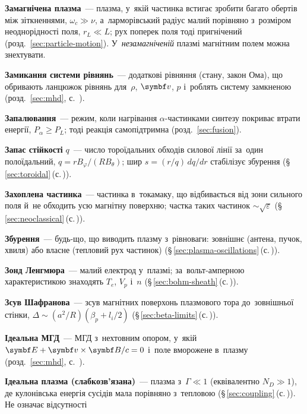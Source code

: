	\item \textbf{Замагнічена плазма}~--- плазма, у~якій частинка встигає зробити багато обертів між
	  зіткненнями, $\omega_c\gg\nu$, а~ларморівський радіус малий порівняно з~розміром неоднорідності поля,
	  $r_L\ll L$; рух поперек поля тоді пригнічений (розд.~\ref{sec:particle-motion}). У~\emph{незамагніченій}
	  плазмі магнітним полем можна знехтувати.
	\item \textbf{Замикання системи рівнянь}~--- додаткові рівняння (стану, закон Ома), що обривають ланцюжок рівнянь для~$\rho$, $\vect v$, $p$ і~роблять систему замкненою (розд.~\ref{sec:mhd}, с.~\pageref{sec:mhd}).
	\item \textbf{Запалювання}~--- режим, коли нагрівання $\alpha$-частинками синтезу покриває втрати енергії, $P_\alpha\ge P_L$; тоді реакція самопідтримна (розд.~\ref{sec:fusion}).
	\item \textbf{Запас стійкості} $q$~--- число тороїдальних обходів силової лінії за~один полоїдальний, $q=rB_\varphi/(RB_\theta)$; шир $s=(r/q)\,dq/dr$ стабілізує збурення (§\,\ref{sec:toroidal}\,(с.\,\pageref{sec:toroidal})).
	\item \textbf{Захоплена частинка}~--- частинка в~токамаку, що відбивається від зони сильного поля й~не обходить усю магнітну поверхню; частка таких частинок $\sim\sqrt{\varepsilon}$ (§\,\ref{sec:neoclassical}\,(с.\,\pageref{sec:neoclassical})).
	\item \textbf{Збурення}~--- будь-що, що виводить плазму з~рівноваги: зовнішнє (антена, пучок, хвиля) або власне
	  (тепловий рух частинок) (§\,\ref{sec:plasma-oscillations}\,(с.\,\pageref{sec:plasma-oscillations})).
	\item \textbf{Зонд Ленгмюра}~--- малий електрод у~плазмі; за~вольт-амперною характеристикою знаходять $T_e$, $V_p$ і~$n$
	  (§\,\ref{sec:bohm-sheath}\,(с.\,\pageref{sec:bohm-sheath})).
	\item \textbf{Зсув Шафранова}~--- зсув магнітних поверхонь плазмового тора до~зовнішньої стінки, $\Delta\sim(a^2/R)(\beta_p+l_i/2)$ (§\,\ref{sec:beta-limits}\,(с.\,\pageref{sec:beta-limits})).
	\item \textbf{Ідеальна МГД}~--- МГД з~нехтовним опором, у~якій $\vect E+\vect v\times\vect B/c=0$ і~поле вморожене в~плазму (розд.~\ref{sec:mhd}, с.~\pageref{sec:mhd}).
	\item \textbf{Ідеальна плазма (слабкозв'язана)}~--- плазма з~$\Gamma\ll1$ (еквівалентно $N_D\gg1$), де
	  кулонівська енергія сусідів мала порівняно з~тепловою (§\,\ref{sec:coupling}\,(с.\,\pageref{sec:coupling})). Не означає відсутності
